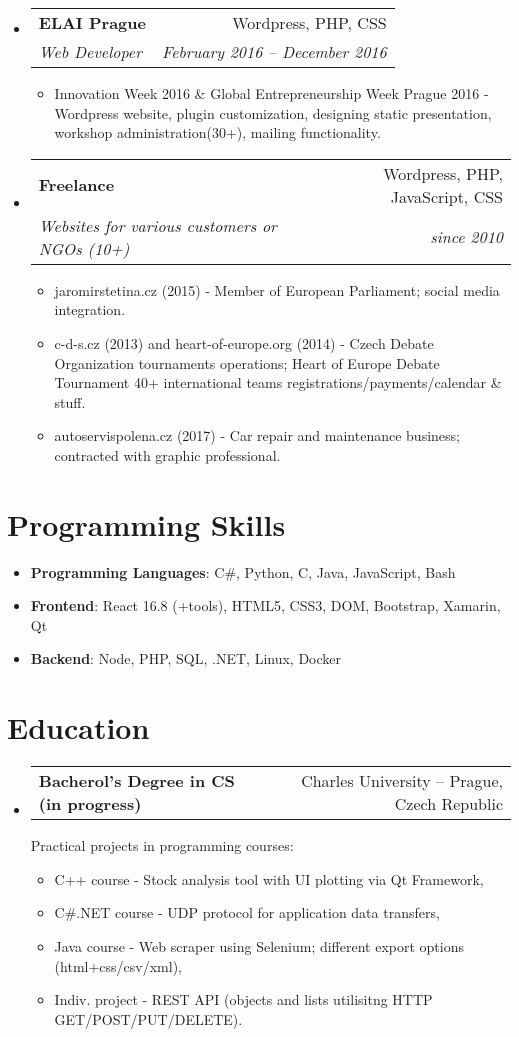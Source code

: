 \documentclass[letterpaper,11pt]{article}
\makeatletter
\newcommand{\sitem}[1]{\item #1 \vspace{-2pt}}
\newcommand{\resumeSubheading}[4]{
  \vspace{-1pt}\item
    \begin{tabular*}{0.97\textwidth}[t]{l@{\extracolsep{\fill}}r}
      \textbf{#1} & #2 \\
      \textit{\small#3} & \textit{\small #4} \\
    \end{tabular*}\vspace{-5pt}
}
\newcommand{\resumeSubheadingg}[2]{
  \vspace{-1pt}\item
    \begin{tabular*}{0.97\textwidth}[t]{l@{\extracolsep{\fill}}r}
      \textbf{#1} & #2
    \end{tabular*}\vspace{-5pt}
}
\newenvironment{subheadingListing}{\begin{itemize}[leftmargin=*]}{\end{itemize}}
\newenvironment{resumeList}{\begin{itemize}}{\end{itemize}\vspace{-5pt}}
\newcommand{\CC}{C\nolinebreak\hspace{-.05em}\raisebox{.4ex}{\tiny\bf +}\nolinebreak\hspace{-.10em}\raisebox{.4ex}{\tiny\bf +}}
\makeatother
\begin{document}
\begin{subheadingListing}
  \resumeSubheading
  {ELAI Prague}{Wordpress, PHP, CSS}
  {Web Developer}{February 2016 – December 2016}
  \begin{resumeList}
    \sitem{Innovation Week 2016 \& Global Entrepreneurship Week Prague 2016 - Wordpress website, plugin customization, designing static presentation, workshop administration(30+), mailing functionality.}
 \end{resumeList}

  \resumeSubheading
  {Freelance}{Wordpress, PHP, JavaScript, CSS}
  {Websites for various customers or NGOs (10+)}{since 2010}
  \begin{resumeList}
    \sitem{jaromirstetina.cz (2015) - Member of European Parliament; social media integration.}
    \sitem{c-d-s.cz (2013) and heart-of-europe.org (2014) - Czech Debate Organization tournaments operations; Heart of Europe Debate Tournament 40+ international teams registrations/payments/calendar \& stuff. }
    \sitem{autoservispolena.cz (2017) - Car repair and maintenance business; contracted with graphic professional.}  
  \end{resumeList}

\end{subheadingListing}


\section{Programming Skills}
\begin{subheadingListing}
  \sitem{
    \textbf{Programming Languages}{: C\#, Python, \CC, Java, JavaScript, Bash}
  }
  \sitem{
    \textbf{Frontend}{: React 16.8 (+tools), HTML5, CSS3, DOM, Bootstrap, Xamarin, Qt}
  }
  \sitem{
    \textbf{Backend}{: Node, PHP, SQL, .NET, Linux, Docker}
  }
\end{subheadingListing}


\section{Education}
\begin{subheadingListing}

  \resumeSubheadingg
  {Bacherol's Degree in CS (in progress)}{Charles University – Prague, Czech Republic}

  Practical projects in programming courses:
  \begin{resumeList}
    \sitem{C++ course - Stock analysis tool with UI plotting via Qt Framework,}
    \sitem{C\#.NET course - UDP protocol for application data transfers,}
    \sitem{Java course - Web scraper using Selenium; different export options (html+css/csv/xml),}
    \sitem{Indiv. project - REST API (objects and lists utilisitng HTTP GET/POST/PUT/DELETE).}
  \end{resumeList}
\end{subheadingListing}



\end{document}
